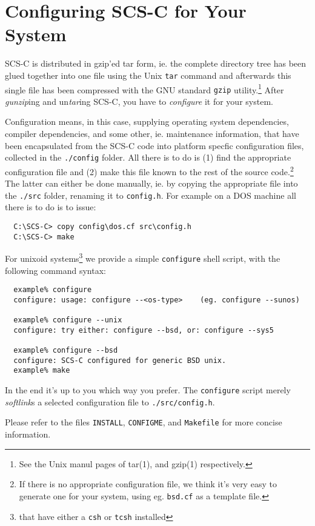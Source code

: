 \section{Configuring SCS-C for Your System}
\label{config}

SCS-C is distributed in gzip'ed tar form, ie. the complete directory
tree has been glued together into one file using the Unix {\tt tar}
command and afterwards this single file has been compressed with the
GNU standard {\tt gzip} utility.\footnote{See the Unix manul pages
of tar(1), and gzip(1) respectively.}
After {\em gunzip\/}ing and un{\em tar\/}ing SCS-C, you have to
{\em configure} it for your system.

Configuration means, in this case, supplying operating system dependencies,
compiler dependencies, and some other, ie. maintenance information,
that have been encapsulated from the SCS-C code
into platform specfic configuration files, collected in the {\tt ./config}
folder. All there is to do is (1) find the appropriate configuration file
and (2) make this file known to the rest of the source code.\footnote{%
If there is no appropriate configuration file, we think it's very easy
to generate one for your system, using eg. {\tt bsd.cf} as a template file.}
The latter can either be done manually, ie. by copying the appropriate
file into the {\tt ./src} folder, renaming it to {\tt config.h}.
For example on a DOS machine all there is to do is to issue:
\begin{verbatim}
  C:\SCS-C> copy config\dos.cf src\config.h
  C:\SCS-C> make
\end{verbatim}
For unixoid systems\footnote{that have either a {\tt csh} or {\tt tcsh}
installed} we provide a simple {\tt configure} shell script, with the
following command syntax:
\begin{verbatim}
  example% configure
  configure: usage: configure --<os-type>    (eg. configure --sunos)

  example% configure --unix
  configure: try either: configure --bsd, or: configure --sys5

  example% configure --bsd
  configure: SCS-C configured for generic BSD unix.
  example% make
\end{verbatim}
In the end it's up to you which way you prefer. The {\tt configure} script
merely {\em softlink\/}s a selected configuration file to
{\tt ./src/config.h}.

Please refer to the files {\tt INSTALL}, {\tt CONFIGME}, and {\tt Makefile}
for more concise information.


